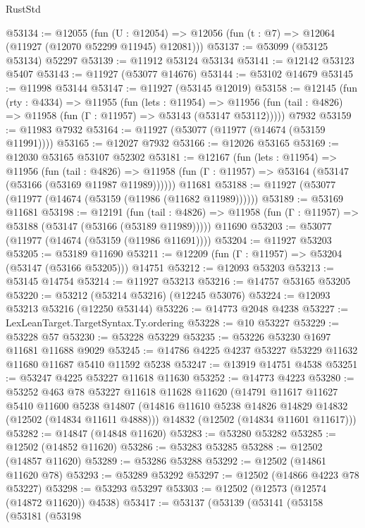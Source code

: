 \begin{lexlean}{RustStd}
\begin{coremodule}
@53134 := @12055
    (fun (U : @12054) => @12056 (fun (t : @7) => @12064 (@11927 (@12070 @52299 @11945) @12081)))
@53137 := @53099 (@53125 @53134) @52297
@53139 := @11912 @53124 @53134
@53141 := @12142 @53123 @5407
@53143 := @11927 (@53077 @14676)
@53144 := @53102 @14679
@53145 := @11998 @53144
@53147 := @11927 (@53145 @12019)
@53158 := @12145
    (fun (rty : @4334) =>
    @11955
      (fun (lets : @11954) =>
      @11956 (fun (tail : @4826) => @11958 (fun (Γ : @11957) => @53143 (@53147 @53112)))))
    @7932
@53159 := @11983 @7932
@53164 := @11927 (@53077 (@11977 (@14674 (@53159 @11991))))
@53165 := @12027 @7932
@53166 := @12026 @53165
@53169 := @12030 @53165 @53107 @52302
@53181 := @12167
    (fun (lets : @11954) =>
    @11956
      (fun (tail : @4826) =>
      @11958 (fun (Γ : @11957) => @53164 (@53147 (@53166 (@53169 @11987 @11989))))))
    @11681
@53188 := @11927 (@53077 (@11977 (@14674 (@53159 (@11986 (@11682 @11989))))))
@53189 := @53169 @11681
@53198 := @12191
    (fun (tail : @4826) => @11958 (fun (Γ : @11957) => @53188 (@53147 (@53166 (@53189 @11989)))))
    @11690
@53203 := @53077 (@11977 (@14674 (@53159 (@11986 @11691))))
@53204 := @11927 @53203
@53205 := @53189 @11690
@53211 := @12209 (fun (Γ : @11957) => @53204 (@53147 (@53166 @53205))) @14751
@53212 := @12093 @53203
@53213 := @53145 @14754
@53214 := @11927 @53213
@53216 := @14757 @53165 @53205
@53220 := @53212 (@53214 @53216) (@12245 @53076)
@53224 := @12093 @53213 @53216 (@12250 @53144)
@53226 := @14773 @2048 @4238
@53227 := LexLeanTarget.TargetSyntax.Ty.ordering
@53228 := @10 @53227
@53229 := @53228 @57
@53230 := @53228 @53229
@53235 := @53226 @53230 @1697 @11681 @11688 @9029
@53245 := @14786 @4225 @4237 @53227 @53229 @11632 @11680 @11687 @5410 @11592 @5238
@53247 := @13919 @14751 @4538
@53251 := @53247 @4225 @53227 @11618 @11630
@53252 := @14773 @4223
@53280 := @53252
    @463
    @78
    @53227
    @11618
    @11628
    @11620
    (@14791
      @11617
      @11627
      @5410
      @11600
      @5238
      @14807
      (@14816 @11610 @5238 @14826 @14829 @14832 (@12502 (@14834 @11611 @4888)))
      @14832
      (@12502 (@14834 @11601 @11617)))
@53282 := @14847 (@14848 @11620)
@53283 := @53280 @53282
@53285 := @12502 (@14852 @11620)
@53286 := @53283 @53285
@53288 := @12502 (@14857 @11620)
@53289 := @53286 @53288
@53292 := @12502 (@14861 @11620 @78)
@53293 := @53289 @53292
@53297 := @12502 (@14866 @4223 @78 @53227)
@53298 := @53293 @53297
@53303 := @12502 (@12573 (@12574 (@14872 @11620)) @4538)
@53417 := @53137
    (@53139
      (@53141
        (@53158
          (@53181
            (@53198

\end{coremodule}
\end{lexlean}

